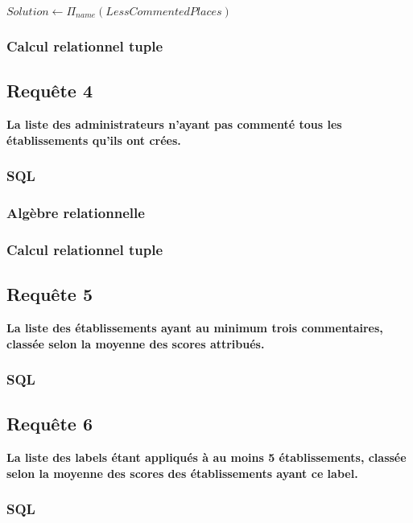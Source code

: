 \documentclass[a4paper,10pt]{article}
\begin{document}
$ Solution \leftarrow \Pi_{name}(LessCommentedPlaces) $

\subsubsection{Calcul relationnel tuple}

\newpage

\subsection{Requête 4}

\textbf{La liste des administrateurs n’ayant pas commenté tous les établissements qu’ils ont crées.}

\subsubsection{SQL}

\subsubsection{Algèbre relationnelle}

\subsubsection{Calcul relationnel tuple}

\newpage

\subsection{Requête 5}

\textbf{La liste des établissements ayant au minimum trois commentaires, classée selon la moyenne des scores attribués.}

\subsubsection{SQL}

\subsection{Requête 6}

\textbf{La liste des labels étant appliqués à au moins 5 établissements, classée selon la moyenne des scores des établissements ayant ce label.}

\subsubsection{SQL}
\end{document}
